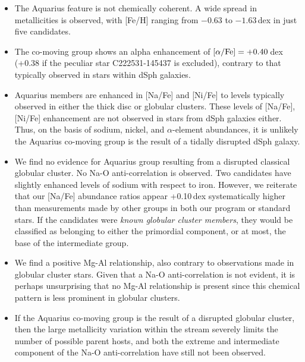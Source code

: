 \documentclass{emulateapj}
\begin{document}
\begin{itemize}
\item The Aquarius feature is not chemically coherent. A wide spread in metallicities is observed, with [Fe/H] ranging from $-0.63$ to $-1.63$\,dex in just five candidates.

\item The co-moving group shows an alpha enhancement of ${[\alpha/{\rm Fe}] = +0.40}$\,dex (+0.38 if the peculiar star {C222531-145437} is excluded), contrary to that typically observed in stars within dSph galaxies.

\item Aquarius members are enhanced in [Na/Fe] and [Ni/Fe] to levels typically observed in either the thick disc or globular clusters. These levels of [Na/Fe], [Ni/Fe] enhancement are not observed in stars from dSph galaxies either. Thus, on the basis of sodium, nickel, and $\alpha$-element abundances, it is unlikely the Aquarius co-moving group is the result of a tidally disrupted dSph galaxy.

\item We find no evidence for Aquarius group resulting from a disrupted classical globular cluster. No Na-O anti-correlation is observed. Two candidates have slightly enhanced levels of sodium with respect to iron. However, we reiterate that our [Na/Fe] abundance ratios appear +0.10\,dex systematically higher than measurements made by other groups in both our program or standard stars. If the candidates were \textit{known globular cluster members}, they would be classified as belonging to either the primordial component, or at most, the base of the intermediate group. 

\item We find a positive Mg-Al relationship, also contrary to observations made in globular cluster stars. Given that a Na-O anti-correlation is not evident, it is perhaps unsurprising that no Mg-Al relationship is present since this chemical pattern is less prominent in globular clusters.

\item If the Aquarius co-moving group is the result of a disrupted globular cluster, then the large metallicity variation within the stream severely limits the number of possible parent hosts, and both the extreme and intermediate component of the Na-O anti-correlation have still not been observed.


\end{itemize}
\end{document}
